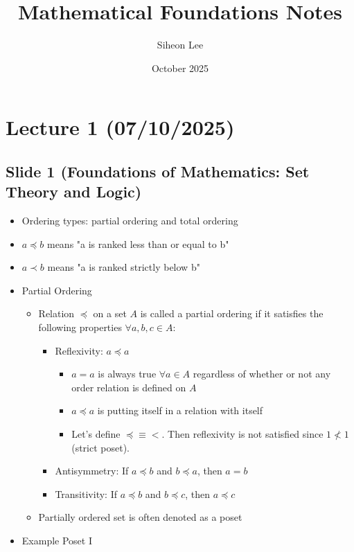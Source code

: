 \documentclass{article}
\title{Mathematical Foundations Notes}
\author{Siheon Lee}
\date{October 2025}
\begin{document}
\maketitle
\tableofcontents
\newpage

\section{Lecture 1 (07/10/2025)}
\subsection{Slide 1 (Foundations of Mathematics: Set Theory and Logic)}
\begin{itemize}
    \item Ordering types: partial ordering and total ordering
    \item $a \preceq b$ means "a is ranked less than or equal to b"
    \item $a \prec b$ means "a is ranked strictly below b"
    \item Partial Ordering
    \begin{itemize}
        \item Relation $\preceq$ on a set $A$ is called a partial ordering if it satisfies the following properties $\forall a,b,c \in A$:
        \begin{itemize}
            \item Reflexivity: $a \preceq a$
            \begin{itemize}
                \item $a=a$ is always true $\forall a \in A$ regardless of whether or not any order relation is defined on $A$
                \item $a \preceq a$ is putting itself in a relation with itself
                \item Let's define $\preceq \equiv <$. Then reflexivity is not satisfied since $1 \nless 1$ (strict poset).
            \end{itemize}
            \item Antisymmetry: If $a \preceq b$ and $b \preceq a$, then $a=b$
            \item Transitivity: If $a \preceq b$ and $b \preceq c$, then $a \preceq c$
        \end{itemize}
        \item Partially ordered set is often denoted as a poset
    \end{itemize}
    \item Example Poset I

\end{itemize}
\end{document}
